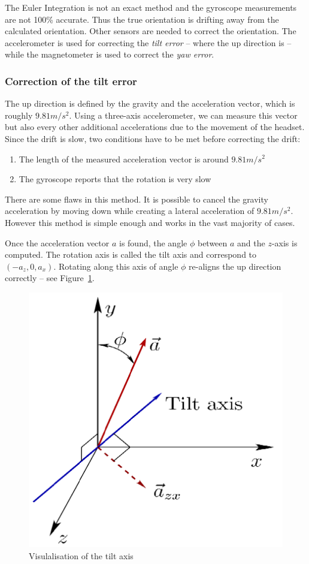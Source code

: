 \documentclass[12pt]{article}
\begin{document}
The Euler Integration is not an exact method and the gyroscope measurements are not 100\% accurate. Thus the true orientation is drifting away from the calculated orientation. Other sensors are needed to correct the orientation. The accelerometer is used for correcting the \textit{tilt error} -- where the up direction is -- while the magnetometer is used to correct the \textit{yaw error}.

\subsubsection{Correction of the tilt error}
The up direction is defined by the gravity and the acceleration vector, which is roughly $9.81m/s^2$. Using a three-axis accelerometer, we can measure this vector but also every other additional accelerations due to the movement of the headset. Since the drift is slow, two conditions have to be met before correcting the drift:
\begin{enumerate}
\item The length of the measured acceleration vector is around $9.81m/s^2$
\item The gyroscope reports that the rotation is very slow
\end{enumerate}
There are some flaws in this method. It is possible to cancel the gravity acceleration by moving down while creating a lateral acceleration of $9.81m/s^2$. However this method is simple enough and works in the vast majority of cases.

Once the acceleration vector $a$ is found, the angle $\phi$ between $a$ and the $z$-axis is computed. The rotation axis is called the tilt axis and correspond to $(-a_z, 0, a_x)$. Rotating along this axis of angle $\phi$ re-aligns the up direction correctly -- see Figure~\ref{tilt}.

\begin{figure}[h]
  \centering
  \includegraphics[scale=0.2]{tilt.png}
  \caption{\label{tilt} Visulalisation of the tilt axis}
\end{figure}
\end{document}
